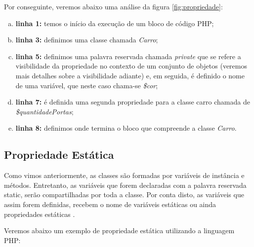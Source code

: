 \FloatBarrier 	%

Por conseguinte, veremos abaixo uma análise da figura \ref{fig:propriedade}:

\begin{enumerate}[a)]
    \item \textbf{linha 1:} temos o início da execução de um bloco de código PHP;
    \item \textbf{linha 3:} definimos uma classe chamada \textit{Carro};
    \item \textbf{linha 5:} definimos uma palavra reservada chamada
    \textit{private} que se refere a visibilidade da propriedade no contexto  de
    um conjunto de objetos (veremos mais detalhes sobre a visibilidade adiante) 
    e, em seguida, é definido o nome de uma variável, que neste caso chama-se
    \textit{\$cor};
    \item \textbf{linha 7:} é definida uma segunda propriedade para a classe
    carro chamada de \textit{\$quantidadePortas};
    \item \textbf{linha 8:} definimos onde termina o bloco que compreende a
    classe \textit{Carro}.
\end{enumerate}

\subsection{Propriedade Estática}

Como vimos anteriormente, as classes são formadas por variáveis de instância e
métodos. Entretanto, as variáveis que forem declaradas com a palavra reservada 
static, serão compartilhadas por toda a classe. Por conta disto, as variáveis 
que assim forem definidas, recebem o nome de variáveis estáticas ou ainda 
propriedades estáticas \cite{learningJava}.

Veremos abaixo um exemplo de propriedade estática utilizando a linguagem PHP:
